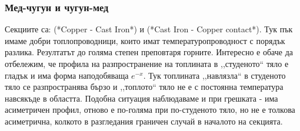 \subsubsection{Мед-чугун и чугун-мед}
Секциите са: \textcolor{comment}{(*Copper - Cast Iron*)} и \textcolor{comment}{(*Cast Iron - Copper contact*)}. 
Тук пък имаме добри топлопроводници, които имат температуропроводност с порядък разлика. Резултатът до голяма степен преповтаря горните. 
Интересно е обаче да отбележим, че профила на разпространение на топлината в ,,студеното`` тяло е гладък и има форма наподобяваща $e^{-x}$. Тук топлината ,,навлязла`` в студеното тяло се разпространява бързо и ,,топлото`` тяло не е с постоянна температура навсякъде в областта.
Подобна ситуация наблюдаваме и при грешката - има асиметричен профил, отново е по-голяма при по-студеното тяло, но не е толкова асиметрична, колкото в разгледания граничен случай в началото на секцията.

